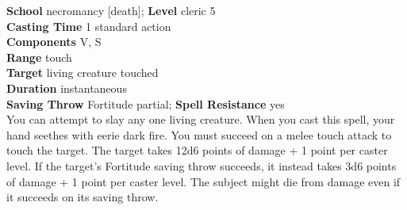 \textbf{School} necromancy [death]; \textbf{Level} cleric 5\\
\textbf{Casting Time} 1 standard action\\
\textbf{Components} V, S\\
\textbf{Range} touch\\
\textbf{Target} living creature touched\\
\textbf{Duration} instantaneous\\
\textbf{Saving Throw} Fortitude partial; \textbf{Spell Resistance} yes\\
You can attempt to slay any one living creature. When you cast this spell, your hand seethes with eerie dark fire. You must succeed on a melee touch attack to touch the target. The target takes 12d6 points of damage + 1 point per caster level. If the target's Fortitude saving throw succeeds, it instead takes 3d6 points of damage + 1 point per caster level. The subject might die from damage even if it succeeds on its saving throw.\\

